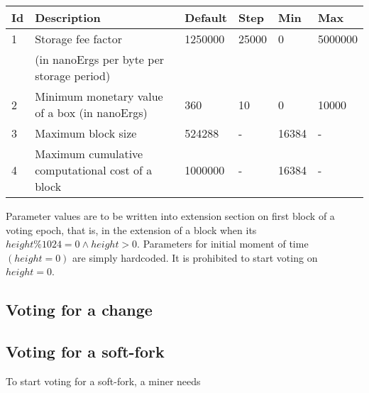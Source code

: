 \begin{tabular}{| l | l | l | l | l | l |}
\hline
Id & Description & Default & Step & Min & Max \\
\hline
\hline
1 & Storage fee factor  & 1250000 & 25000 & 0 & 5000000 \\
  &  (in nanoErgs per byte per storage period) & & & & \\
\hline
2 & Minimum monetary value of a box (in nanoErgs) & 360 & 10 & 0 & 10000 \\
\hline
3 & Maximum block size & 524288 & - & 16384 & - \\
\hline
4 & Maximum cumulative computational cost of a block & 1000000 & - & 16384 & - \\
\hline
\end{tabular}

Parameter values are to be written into extension section on first block of a voting epoch, that is, in the extension
of a block when its $height \% 1024 = 0 \land height > 0$. Parameters for initial moment of time~$(height = 0)$ are simply
hardcoded. It is prohibited to start voting on $height = 0$.



\subsection{Voting for a change}

\subsection{Voting for a soft-fork}

To start voting for a soft-fork, a miner needs